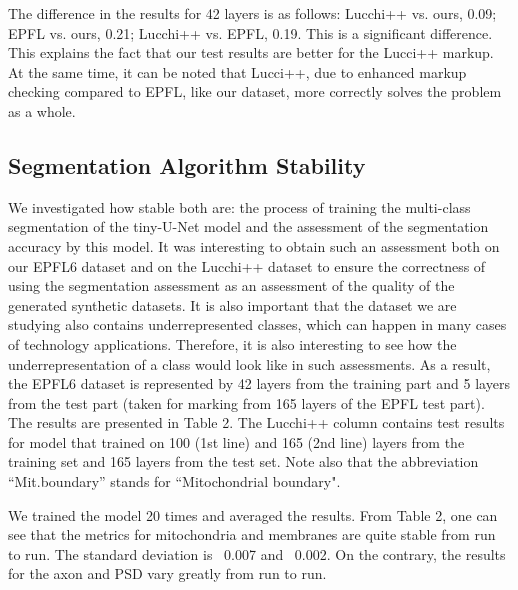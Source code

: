 \documentclass[journal,article,submit,pdftex,moreauthors]{Definitions/mdpi}
\begin{document}
The difference in the results for 42 layers is as follows: Lucchi++ vs. ours, 0.09; EPFL vs. ours, 0.21; Lucchi++ vs. EPFL, 0.19. This is a significant difference. This explains the fact that our test results are better for the Lucci++ markup. At the same time, it can be noted that Lucci++, due to enhanced markup checking compared to EPFL, like our dataset, more correctly solves the problem as a whole.

\subsection{Segmentation Algorithm Stability}

We investigated how stable both are: the process of training the multi-class segmentation of the tiny-U-Net model and the assessment of the segmentation accuracy by this model. It was interesting to obtain such an assessment both on our EPFL6 dataset and on the Lucchi++ dataset to ensure the correctness of using the segmentation assessment as an assessment of the quality of the generated synthetic datasets. It is also important that the dataset we are studying also contains underrepresented classes, which can happen in many cases of technology applications. Therefore, it is also interesting to see how the underrepresentation of a class would look like in such assessments. As a result, the EPFL6 dataset is represented by 42 layers from the training part and 5 layers from the test part (taken for marking from 165 layers of the EPFL test part). The results are presented in Table 2. The Lucchi++ column contains test results for model that trained on 100 (1st line) and 165 (2nd line) layers from the training set and 165 layers from the test set. Note also that the abbreviation “Mit.boundary” stands for “Mitochondrial boundary".

We trained the model 20 times and averaged the results. From Table 2, one can see that the metrics for mitochondria and membranes are quite stable from run to run. The standard deviation is ~0.007 and ~0.002. On the contrary, the results for the axon and PSD vary greatly from run to run.
\end{document}
